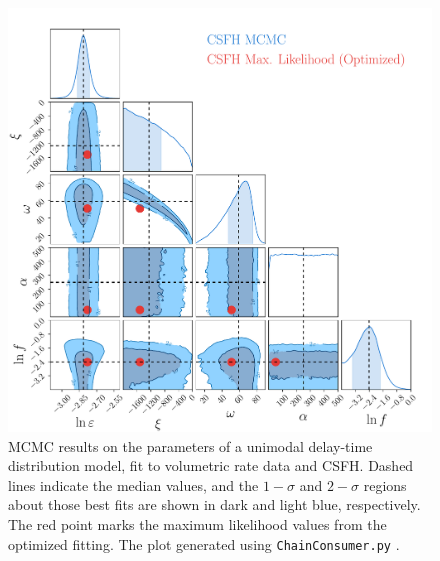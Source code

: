 \documentclass[apj]{aastex62}
\begin{document}
\clearpage
\begin{figure}[t] 
   \centering
   \includegraphics[width=5.0in]{figure_sfd_corners.pdf} 
   \caption{\footnotesize MCMC results on the parameters of a unimodal delay-time distribution model, fit to volumetric rate data and CSFH. Dashed lines indicate the median values, and the $1-\sigma$ and $2-\sigma$ regions about those best fits are shown in dark and light blue, respectively. The red point marks the maximum likelihood values from the optimized fitting. The plot generated using {\tt ChainConsumer.py} \citep{Hinton:2016qy}.}
   \label{fig:mcmc_sfd}
\end{figure}
\end{document}
